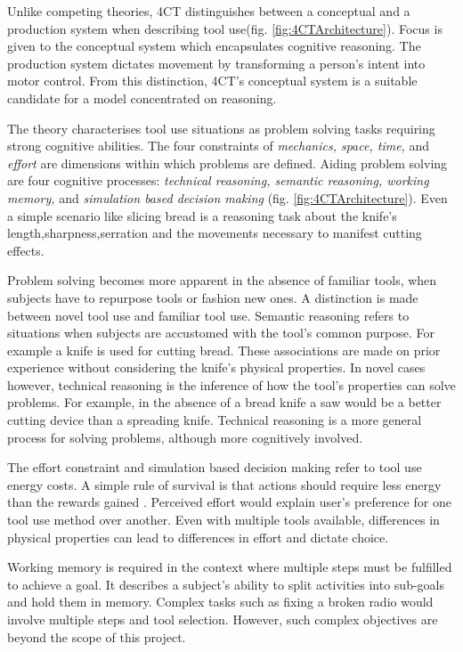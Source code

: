 \documentclass[11]{article}
\begin{document}
Unlike competing theories, 4CT distinguishes between a conceptual and a production system when describing tool use(fig. \ref{fig:4CTArchitecture}).
Focus is given to the conceptual system which encapsulates cognitive reasoning.
The production system dictates movement by transforming a person's intent into motor control. 
From this distinction, 4CT's conceptual system is a suitable candidate for a model concentrated on reasoning.


The theory characterises tool use situations as problem solving tasks requiring strong cognitive abilities. 
The four constraints of \emph{mechanics, space, time,} and \emph{effort} are dimensions within which problems are defined.
Aiding problem solving are four cognitive processes: \emph{technical reasoning, semantic reasoning, working memory,} and \emph{simulation based decision making} (fig. \ref{fig:4CTArchitecture}).  
Even a simple scenario like slicing bread is a reasoning task about the knife's length,sharpness,serration and the movements necessary to manifest cutting effects. 

Problem solving becomes more apparent in the absence of familiar tools, when subjects have to repurpose tools or fashion new ones.
A distinction is made between novel tool use and familiar tool use. 
Semantic reasoning refers to situations when subjects are accustomed with the tool's common purpose. 
For example a knife is used for cutting bread. 
These associations are made on prior experience without considering the knife's physical properties.  
In novel cases however, technical reasoning is the inference of how the tool's properties can solve problems.
For example, in the absence of a bread knife a saw would be a better cutting device than a spreading knife. 
Technical reasoning is a more general process for solving problems, although more cognitively involved.  

The effort constraint and simulation based decision making refer to tool use energy costs. 
A simple rule of survival is that actions should require less energy than the rewards gained \cite{proffitt2006}.
Perceived effort would explain user's preference for one tool use method over another. 
Even with multiple tools  available, differences in physical properties can lead to differences in effort and dictate choice. 

Working memory is required in the context where multiple steps must be fulfilled to achieve a goal. 
It describes a subject's ability to split activities into sub-goals and hold them in memory. 
Complex tasks such as fixing a broken radio would involve multiple steps and tool selection. 
However, such complex objectives are beyond the scope of this project.
\end{document}
